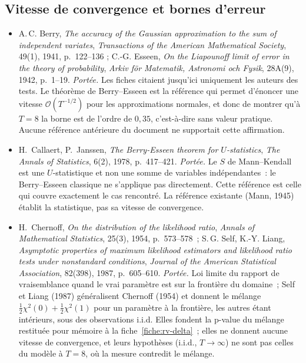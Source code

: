 \documentclass[a4paper,11pt]{article}
\begin{document}
\subsection*{Vitesse de convergence et bornes d'erreur}

\begin{itemize}[itemsep=4pt]
  \item A.\,C. Berry, \emph{The accuracy of the Gaussian approximation to the
  sum of independent variates}, \emph{Transactions of the American Mathematical
  Society}, 49(1), 1941, p.~122--136 ; C.-G. Esseen, \emph{On the Liapounoff
  limit of error in the theory of probability}, \emph{Arkiv för Matematik,
  Astronomi och Fysik}, 28A(9), 1942, p.~1--19.
  \emph{Portée.} Les fiches citaient jusqu'ici uniquement les
  auteurs des tests. Le théorème de Berry--Esseen est la référence qui permet
  d'énoncer une vitesse $\mathcal{O}(T^{-1/2})$ pour les approximations
  normales, et donc de montrer qu'à $T = 8$ la borne est de l'ordre de
  $0{,}35$, c'est-à-dire sans valeur pratique. Aucune référence antérieure du
  document ne supportait cette affirmation.

  \item H.~Callaert, P.~Janssen, \emph{The Berry-Esseen theorem for
  $U$-statistics}, \emph{The Annals of Statistics}, 6(2), 1978, p.~417--421.
  \emph{Portée.} Le $S$ de Mann--Kendall est une $U$-statistique et
  non une somme de variables indépendantes~: le Berry--Esseen classique ne
  s'applique pas directement. Cette référence est celle qui couvre exactement le
  cas rencontré. La référence existante (Mann, 1945) établit la statistique,
  pas sa vitesse de convergence.

  \item H.~Chernoff, \emph{On the distribution of the likelihood ratio},
  \emph{Annals of Mathematical Statistics}, 25(3), 1954, p.~573--578~;
  S.\,G. Self, K.-Y. Liang, \emph{Asymptotic properties of maximum likelihood
  estimators and likelihood ratio tests under nonstandard conditions},
  \emph{Journal of the American Statistical Association}, 82(398), 1987,
  p.~605--610.
  \emph{Portée.} Loi limite du rapport de vraisemblance quand le vrai paramètre
  est sur la frontière du domaine~; Self et Liang (1987) généralisent Chernoff
  (1954) et donnent le mélange $\tfrac12\chi^2(0) + \tfrac12\chi^2(1)$ pour un
  paramètre à la frontière, les autres étant intérieurs, sous des observations
  i.i.d. Elles fondent la p-value du mélange restituée pour mémoire à la
  fiche~\ref{fiche:rv-delta}~; elles ne donnent aucune vitesse de convergence, et
  leurs hypothèses (i.i.d., $T \to \infty$) ne sont pas celles du modèle à
  $T = 8$, où la mesure contredit le mélange.
\end{itemize}
\end{document}
